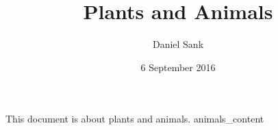 \documentclass{article}
\title{Plants and Animals}
\author{Daniel Sank}
\date{6 September 2016}
\begin{document}
\maketitle
This document is about plants and animals.
{animals_content}
\end{document}
